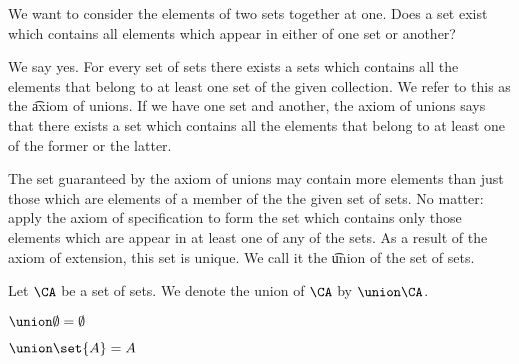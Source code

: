 
\sbasic








\sstart
{}


We want to consider the elements of two sets together at one.
Does a set exist which contains all elements which appear in either of one set or another?


We say yes.
For every set of sets there exists a sets which contains all the elements that belong to at least one set of the given collection.
We refer to this as the \t{axiom of unions}.
If we have one set and another, the axiom of unions says that there exists a set which contains all the elements that belong to at least one of the former or the latter.

The set guaranteed by the axiom of unions may contain more elements than just those which are elements of a member of the the given set of sets.
No matter: apply the axiom of specification to form the set which contains only those elements which are appear in at least one of any of the sets.
As a result of the axiom of extension, this set is unique.
We call it the \t{union} of the set of sets.


Let $\CA$ be a set of sets.
We denote the union of $\CA$ by $\union \CA$.


\begin{prop}
$\union \emptyset = \emptyset$
\end{prop}

\begin{prop}
$\union \set{A} = A$
\end{prop}
\strats
